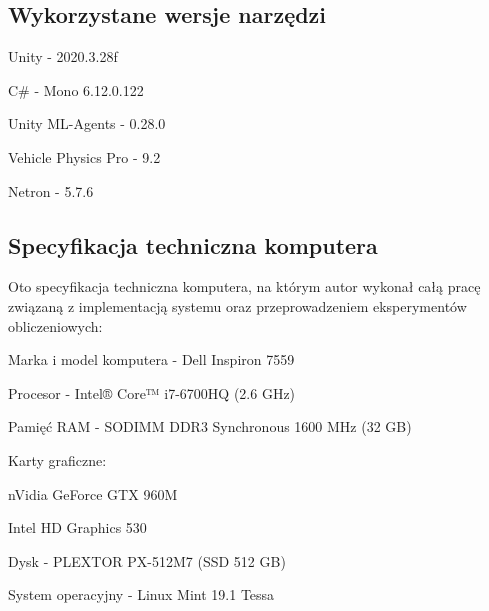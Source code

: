 \subsection{Wykorzystane wersje narzędzi}
\begin{enumerate*}
\item Unity - 2020.3.28f
\item C\# - Mono 6.12.0.122
\item Unity ML-Agents - 0.28.0
\item Vehicle Physics Pro - 9.2
\item Netron - 5.7.6
\end{enumerate*}

\subsection{Specyfikacja techniczna komputera}
\label{ComputerTechSpecs}
Oto specyfikacja techniczna komputera, na którym autor wykonał całą pracę związaną z implementacją systemu oraz przeprowadzeniem eksperymentów obliczeniowych:
\begin{enumerate*}
\item Marka i model komputera - Dell Inspiron 7559 \cite{dellInspiron:specs}
\item Procesor - Intel® Core™ i7-6700HQ (2.6 GHz) \cite{intelCpu:specs}
\item Pamięć RAM - SODIMM DDR3 Synchronous 1600 MHz (32 GB)
\item Karty graficzne:
\begin{itemize*}
\item nVidia GeForce GTX 960M \cite{nvidiaGPU:specs}
\item Intel HD Graphics 530
\end{itemize*}
\item Dysk - PLEXTOR PX-512M7 (SSD 512 GB)
\item System operacyjny - Linux Mint 19.1 Tessa
\end{enumerate*}
